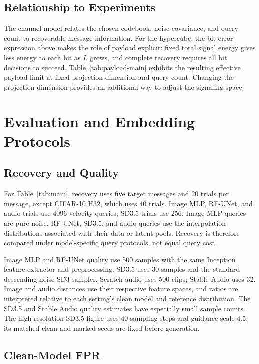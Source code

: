 \documentclass[11pt]{article}
\begin{document}
\subsection{Relationship to Experiments}

The channel model relates the chosen codebook, noise covariance, and
query count to recoverable message information. For the hypercube,
the bit-error expression above makes the role of payload explicit:
fixed total signal energy gives less energy to each bit as $L$ grows,
and complete recovery requires all bit decisions to succeed.
Table~\ref{tab:payload-main} exhibits the resulting effective payload
limit at fixed projection dimension and query count. Changing the
projection dimension provides an additional way to adjust the
signaling space.


\section{Evaluation and Embedding Protocols}\label{app:embedding-configurations}

\subsection{Recovery and Quality}

For Table~\ref{tab:main}, recovery uses five target messages and 20 trials per message, except
CIFAR-10 H32, which uses 40 trials. Image MLP, RF-UNet, and audio trials
use 4096 velocity queries; SD3.5 trials use 256. Image MLP queries are
pure noise. RF-UNet, SD3.5, and audio queries use the interpolation
distributions associated with their data or latent pools. Recovery is
therefore compared under model-specific query protocols, not equal
query cost.

Image MLP and RF-UNet quality use 500 samples with the same Inception
feature extractor and preprocessing. SD3.5 uses 30 samples and the
standard descending-noise SD3 sampler. Scratch audio uses 500 clips;
Stable Audio uses 32. Image and audio distances use their respective
feature spaces, and ratios are interpreted relative to each setting's
clean model and reference distribution. The SD3.5 and Stable Audio
quality estimates have especially small sample counts.
The high-resolution SD3.5 figure uses 40 sampling steps and guidance
scale 4.5; its matched clean and marked seeds are fixed before generation.

\subsection{Clean-Model FPR}\label{app:fpr}
\end{document}
